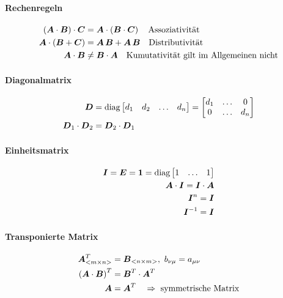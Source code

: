 \paragraph{Rechenregeln}
\begin{align}
	\left(\boldsymbol {A}\cdot \boldsymbol {B}\right)\cdot \boldsymbol {C} &= \boldsymbol {A} \cdot \left(\boldsymbol {B} \cdot \boldsymbol {C}\right) \quad \text{Assoziativität}\\
	\boldsymbol {A} \cdot \left(\boldsymbol {B} + \boldsymbol {C}\right) &= \boldsymbol {A}\,\boldsymbol {B} + \boldsymbol {A}\,\boldsymbol {B} \quad \text{Distributivität}\\
	\boldsymbol {A} \cdot \boldsymbol {B} &\neq \boldsymbol {B} \cdot \boldsymbol {A} \quad \text{Kumutativität gilt im Allgemeinen nicht}
\end{align}

\paragraph{Diagonalmatrix}
\begin{align}
	\boldsymbol {D} &= \text{diag}\begin{bmatrix}d_1 & d_2 & \ldots & d_n\end{bmatrix} = \begin{bmatrix}d_1 & \ldots & 0 \\ 0 & \ldots & d_n\end{bmatrix}\\
	\boldsymbol {D}_1 \cdot \boldsymbol {D}_2 &= \boldsymbol {D}_2 \cdot \boldsymbol {D}_1
\end{align}

\paragraph{Einheitsmatrix}
\begin{align}
	\boldsymbol {I} = \boldsymbol {E} = \boldsymbol {1} = \text{diag}\begin{bmatrix}1 & \ldots & 1\end{bmatrix}\\
	\boldsymbol {A} \cdot \boldsymbol {I} = \boldsymbol {I} \cdot \boldsymbol {A}\\
	\boldsymbol {I}^n = \boldsymbol {I}\\
	\boldsymbol {I}^{-1} = \boldsymbol {I}
\end{align}

\paragraph{Transponierte Matrix}
\begin{align}
	\ma{A}_{<m\times n>}^T &= \ma{B}_{<n\times m>},\ b_{\nu\mu} = a_{\mu\nu}\\
	\left(\ma{A} \cdot \ma{B}\right)^T &= \ma{B}^T \cdot \ma{A}^T\\
	\ma{A} &= \ma{A}^T \quad \Rightarrow \text{ symmetrische Matrix}
\end{align}


